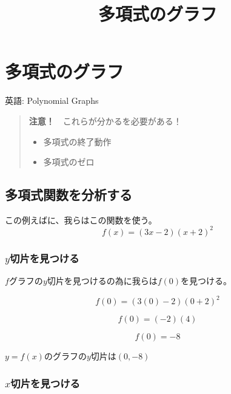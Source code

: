\documentclass[
]{article}
\title{多項式のグラフ}
\author{}
\date{}
\providecommand{\tightlist}{%
  \setlength{\itemsep}{0pt}\setlength{\parskip}{0pt}}
\begin{document}
\maketitle

\hypertarget{ux591aux9805ux5f0fux306eux30b0ux30e9ux30d5}{%
\section{多項式のグラフ}\label{ux591aux9805ux5f0fux306eux30b0ux30e9ux30d5}}

英語: Polynomial Graphs

\begin{quote}
\textbf{注意！}　これらが分かるを必要がある！

\begin{itemize}
\tightlist
\item
  多項式の終了動作
\item
  多項式のゼロ
\end{itemize}
\end{quote}

\hypertarget{ux591aux9805ux5f0fux95a2ux6570ux3092ux5206ux6790ux3059ux308b}{%
\subsection{多項式関数を分析する}\label{ux591aux9805ux5f0fux95a2ux6570ux3092ux5206ux6790ux3059ux308b}}

この例えばに、我らはこの関数を使う。 {\[f(x) = (3x - 2)(x + 2)^{2}\]}

\hypertarget{yux5207ux7247ux3092ux898bux3064ux3051ux308b}{%
\subsubsection{\texorpdfstring{{\(y\)}切片を見つける}{y切片を見つける}}\label{yux5207ux7247ux3092ux898bux3064ux3051ux308b}}

{\(f\)}グラフの{\(y\)}切片を見つけるの為に我らは{\(f(0)\)}を見つける。

\[f(0) = (3(0) - 2)(0 + 2)^{2}\]

\[f(0) = ( - 2)(4)\]

\[f(0) = - 8\]

{\(y = f(x)\)}のグラフの{\(y\)}切片は{\((0, - 8)\)}

\hypertarget{xux5207ux7247ux3092ux898bux3064ux3051ux308b}{%
\subsubsection{\texorpdfstring{{\(x\)}切片を見つける}{x切片を見つける}}\label{xux5207ux7247ux3092ux898bux3064ux3051ux308b}}
\end{document}

